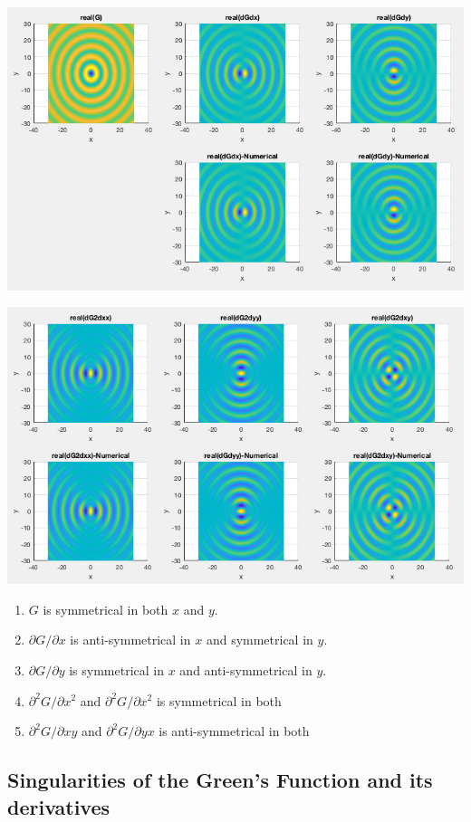 \documentclass{article}
\newcommand{\0}{\varnothing}
\begin{document}
\begin{minipage}{0.75\textwidth}
{\centering

\includegraphics[width=0.75\columnwidth]{figures/GFirstDs}

\includegraphics[width=0.75\columnwidth]{figures/G2ndDs}

}
\end{minipage}
\begin{minipage}{0.25\textwidth}
\begin{enumerate}
    \item $G$ is symmetrical in both $x$ and $y$.
    \item $\partial G/ \partial x$ is anti-symmetrical in  $x$ and symmetrical in $y$.
    \item $\partial G/ \partial y$ is symmetrical in $x$ and anti-symmetrical in $y$.
    \item $\partial^2 G/ \partial x^2$ and $\partial^2 G/ \partial x^2$ is symmetrical in both
    \item $\partial^2 G/ \partial xy$ and $\partial^2 G/ \partial yx$ is anti-symmetrical in both
\end{enumerate}
\end{minipage}

\newpage
\subsection{Singularities of the Green's Function and its derivatives}
\end{document}
